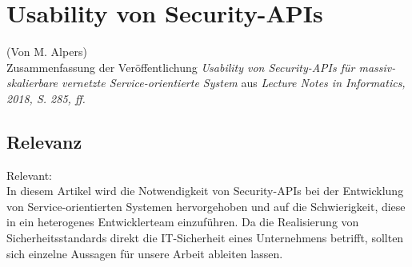 \section{Usability von Security-APIs}
(Von M. Alpers)\\

Zusammenfassung der Veröffentlichung \emph{Usability von Security-APIs für massiv-skalierbare vernetzte Service-orientierte System} aus \emph{Lecture Notes in Informatics, 2018, S. 285, ff.}\\

\subsection{Relevanz}

Relevant:\\

In diesem Artikel wird die Notwendigkeit von Security-APIs bei der Entwicklung von Service-orientierten Systemen hervorgehoben und auf die Schwierigkeit, diese in ein heterogenes Entwicklerteam einzuführen. Da die Realisierung von Sicherheitsstandards direkt die IT-Sicherheit eines Unternehmens betrifft, sollten sich einzelne Aussagen für unsere Arbeit ableiten lassen.